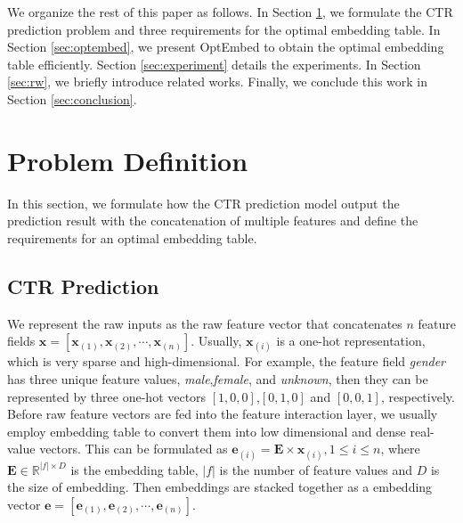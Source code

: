 \documentclass[sigconf]{acmart}
\begin{document}
We organize the rest of this paper as follows. In Section \ref{sec:problem}, we formulate the CTR prediction problem and three requirements for the optimal embedding table. In Section \ref{sec:optembed}, we present OptEmbed to obtain the optimal embedding table efficiently. Section \ref{sec:experiment} details the experiments. In Section \ref{sec:rw}, we briefly introduce related works. Finally, we conclude this work in Section \ref{sec:conclusion}. \section{Problem Definition}
\label{sec:problem}
In this section, we formulate how the CTR prediction model output the prediction result with the concatenation of multiple features and define the requirements for an optimal embedding table.

\subsection{CTR Prediction}
\label{sec:problem:ctr}



We represent the raw inputs as the raw feature vector that concatenates $n$ feature fields $\mathbf{x}=[\mathbf{x}_{(1)},  \mathbf{x}_{(2)}, \cdots, \mathbf{x}_{(n)}]$. Usually, $\mathbf{x}_{(i)}$ is a one-hot representation, which is very sparse and high-dimensional. For example, the feature field \textit{gender} has three unique feature values, \textit{male},\textit{female}, and \textit{unknown}, then they can be represented by three one-hot vectors $[1,0,0]$,$[0,1,0]$ and $[0,0,1]$, respectively. Before raw feature vectors are fed into the feature interaction layer, we usually employ embedding table to convert them into low dimensional and dense real-value vectors. This can be formulated as $\mathbf{e}_{(i)}=\mathbf{E} \times \mathbf{x}_{(i)}, 1 \le i \le n$, where $\mathbf{E}\in\mathbb{R}^{|f|\times D}$ is the embedding table, $|f|$ is the number of feature values and $D$ is the size of embedding. Then embeddings are stacked together as a embedding vector $\mathbf{
e} = [\mathbf{e}_{(1)}, \mathbf{e}_{(2)}, \cdots, \mathbf{e}_{(n)}]$.
\end{document}

